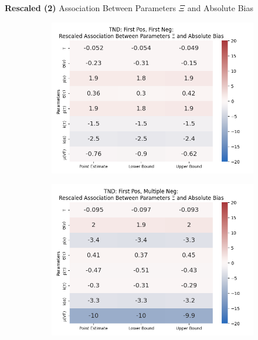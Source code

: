 \documentclass[aspectratio=169]{beamer}
\begin{document}
\begin{frame}{\textbf{Rescaled (2)} Association Between Parameters $\Xi$ and Absolute Bias}
\begin{figure}[H]
		\begin{subfigure}[t]{0.23\linewidth}
			\centering
			\includegraphics[scale=0.25]{VEMethod_Drivers1b_FEest_Realistic2_Li_MSpec_Heatmap9.png}
		\end{subfigure}
		\begin{subfigure}[t]{0.23\linewidth}
			\centering
			\includegraphics[scale=0.25]{VEMethod_Drivers1b_FEest_Realistic2_Li_MSpec_Heatmap10.png}
		\end{subfigure}
	\end{figure}
\end{frame}
\end{document}

